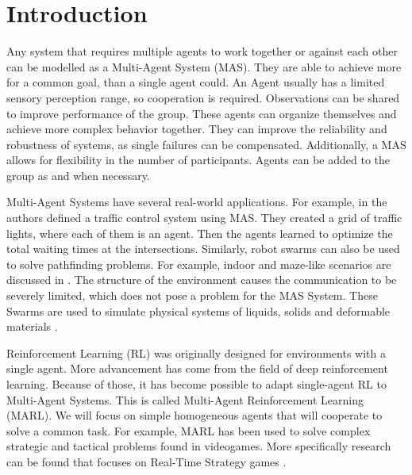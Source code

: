 
\chapter{Introduction}
Any system that requires multiple agents to work together or against each other can be modelled as a Multi-Agent System (MAS). They are able to achieve more for a common goal, than a single agent could. An Agent usually has a limited sensory perception range, so cooperation is required. Observations can be shared to improve performance of the group. These agents can organize themselves and achieve more complex behavior together. They can improve the reliability and robustness of systems, as single failures can be compensated. Additionally, a MAS allows for flexibility in the number of participants. Agents can be added to the group as and when necessary. \par

Multi-Agent Systems have several real-world applications. For example, in \citet{MARLTraffic2020} the authors defined a traffic control system using MAS. They created a grid of traffic lights, where each of them is an agent. Then the agents learned to optimize the total waiting times at the intersections. Similarly, robot swarms can also be used to solve pathfinding problems. For example, indoor and maze-like scenarios are discussed in \citet{SwarmPathFinding2013}. The structure of the environment causes the communication to be severely limited, which does not pose a problem for the MAS System. These Swarms are used to simulate physical systems of liquids, solids and deformable materials \citep{GNS2020}.
\par

Reinforcement Learning (RL) was originally designed for environments with a single agent. More advancement has come from the field of deep reinforcement learning. Because of those, it has become possible to adapt single-agent RL to Multi-Agent Systems. This is called Multi-Agent Reinforcement Learning (MARL). We will focus on simple homogeneous agents that will cooperate to solve a common task. For example, MARL has been used to solve complex strategic and tactical problems found in videogames. More specifically research can be found that focuses on Real-Time Strategy games \citep{RTSMARL2021}. \par

